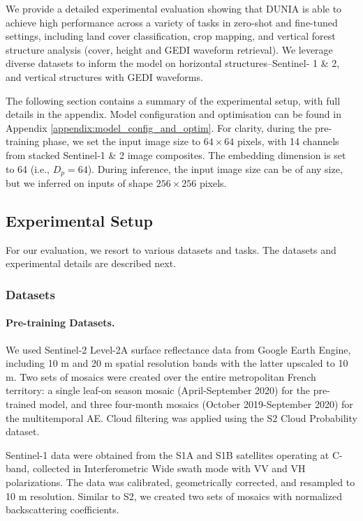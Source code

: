 We provide a detailed experimental evaluation showing that DUNIA is able to achieve high performance across a variety of tasks in zero-shot and fine-tuned settings, including land cover classification, crop mapping, and vertical forest structure analysis (cover, height and GEDI waveform retrieval). We leverage diverse datasets to inform the model on horizontal structures--Sentinel- 1 \& 2, and vertical structures with GEDI waveforms.

The following section contains a summary of the experimental setup, with full details in the appendix. Model configuration and optimisation can be found in Appendix \ref{appendix:model_config_and_optim}. For clarity, during the pre-training phase, we set the input image size to $64\times64$ pixels, with 14 channels from stacked Sentinel-1 \& 2 image composites. The embedding dimension is set to 64 (i.e., $D_p=64$). During inference, the input image size can be of any size, but we inferred on inputs of shape $256\times256$ pixels.

\subsection{Experimental Setup}
For our evaluation, we resort to various datasets and tasks. The datasets and experimental details are described next.

\subsubsection{Datasets}

\paragraph{Pre-training Datasets.} \label{seq:pretraining_datasets}

We used Sentinel-2 Level-2A surface reflectance data from Google Earth Engine, including 10 m and 20 m spatial resolution bands with the latter upscaled to 10 m. Two sets of mosaics were created over the entire metropolitan French territory: a single leaf-on season mosaic (April-September 2020) for the pre-trained model, and three four-month mosaics (October 2019-September 2020) for the multitemporal AE. Cloud filtering was applied using the S2 Cloud Probability dataset.

Sentinel-1 data were obtained from the S1A and S1B satellites operating at C-band, collected in Interferometric Wide swath mode with VV and VH polarizations. The data was calibrated, geometrically corrected, and resampled to 10 m resolution. Similar to S2, we created two sets of mosaics with normalized backscattering coefficients.


